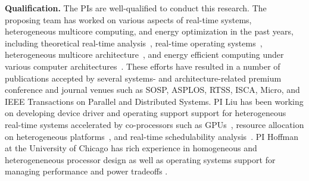 \vspace{2mm} \noindent \textbf{Qualification.} The PIs are well-qualified to conduct this research. The proposing team has worked on various aspects of real-time systems, heterogeneous multicore computing, and energy optimization in the past years, including theoretical real-time analysis~\cite{Liu1, Liu2, Liu6, Liu7, Liu10, liu2014supporting,  Liu3, Liu4, Liu5, Liu9, Liu11, Liu13}, real-time operating systems~\cite{elliott1minimizing, Liu12, GPES, zhou2015supporting, Zhou2014a}, heterogeneous multicore architecture~\cite{Zhou2014a, GPES}, and energy efficient computing under various computer architectures~\cite{Liu12}. These efforts have resulted in a number of publications accepted by several systems- and architecture-related premium conference and journal venues such as SOSP, ASPLOS, RTSS, ISCA, Micro, and IEEE Transactions on Parallel and Distributed Systems. 
PI Liu has been working on developing device driver and operating support support for heterogeneous real-time systems accelerated by co-processors such as GPUs~\cite{Liu12, GPES, zhou2015supporting, Zhou2014a},  resource allocation on heterogeneous platforms~\cite{Tong14a, LiuRTSS14a, LiuRTSS15}, and real-time schedulability analysis~\cite{Liu1, Liu2, Liu6, Liu7, Liu10, liu2014supporting, LiuRTSS14b, elliott1minimizing, Liu3, Liu4, Liu5, Liu9, Liu11, Liu13}.
PI Hoffman at the University of Chicago has rich experience in homogeneous\cite{raw1,raw2,raw3,tilera1,tilera2} and heterogeneneous \cite{ASAP,HPEC,ASAP2,ISSoC} processor design as well as operating systems support for managing performance and power tradeoffs \cite{LEO,POET,DynamicKnobs,JouleGuard,PTRADE,ICAC,TCST,HotPower,CPSNA}.